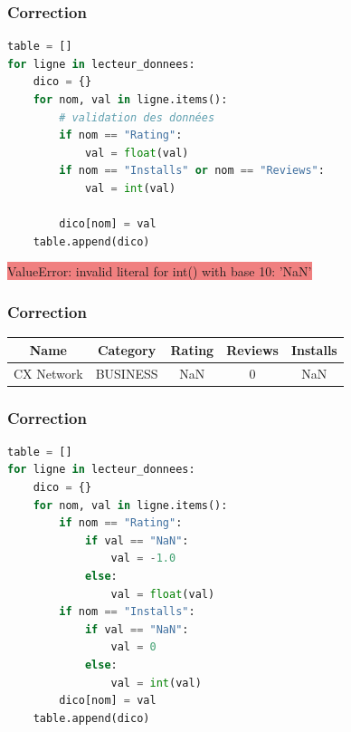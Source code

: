\documentclass[svgnames,11pt]{beamer}
\begin{document}
\begin{frame}[fragile]
    \frametitle{Correction}

    \begin{center}
        \begin{lstlisting}[language=Python, basicstyle=\small, xleftmargin=1em, xrightmargin=1em]
table = []
for ligne in lecteur_donnees:
    dico = {}
    for nom, val in ligne.items():
        # validation des données
        if nom == "Rating":
            val = float(val)
        if nom == "Installs" or nom == "Reviews":
            val = int(val)

        dico[nom] = val
    table.append(dico)
\end{lstlisting}
        \label{CODE}
    \end{center}

    \colorbox{LightCoral}{ValueError: invalid literal for int() with base 10: 'NaN'
    }
\end{frame}
\begin{frame}
    \frametitle{Correction}

    \begin{center}
        \begin{tabular}{|*{5}{c|}}
            \hline
            Name       & Category & Rating & Reviews & Installs \\
            \hline
            CX Network & BUSINESS & NaN    & 0       & NaN      \\
            \hline
        \end{tabular}
    \end{center}
\end{frame}
\begin{frame}[fragile]
    \frametitle{Correction}
    \begin{center}
        \begin{lstlisting}[language=Python, basicstyle=\small, xleftmargin=1em, xrightmargin=1em]
table = []
for ligne in lecteur_donnees:
    dico = {}
    for nom, val in ligne.items():
        if nom == "Rating":
            if val == "NaN":
                val = -1.0
            else:
                val = float(val)
        if nom == "Installs":
            if val == "NaN":
                val = 0
            else:
                val = int(val)
        dico[nom] = val
    table.append(dico)
\end{lstlisting}
        \label{CODE}
    \end{center}
\end{frame}
\end{document}
